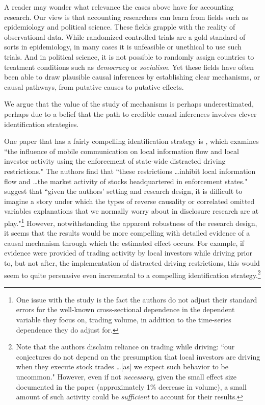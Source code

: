 \documentclass[11pt,reqno,titlepage]{amsart}
\begin{document}
\begin{doublespace}
A reader may wonder what relevance the cases above have for accounting research.
Our view is that accounting researchers can learn from fields such as epidemiology and political science. 
These fields grapple with the reality of observational data.
While randomized controlled trials are a gold standard of sorts in epidemiology, in many cases it is unfeasible or unethical to use such trials.
And in political science, it is not possible to randomly assign countries to treatment conditions such as \emph{democracy} or \emph{socialism}.
Yet these fields have often been able to draw plausible causal inferences by establishing clear mechanisms, or causal pathways, from putative causes to putative effects.

We argue that the value of the study of mechanisms is perhaps underestimated, perhaps due to a belief that the path to credible causal inferences involves clever identification strategies.

One paper that has a fairly compelling identification strategy is \citet{Brown:2015ik}, which examines ``the influence of mobile communication on local information flow and local investor activity using the enforcement of state-wide distracted driving restrictions."
The authors find that ``these restrictions \dots inhibit local information flow and \dots the market activity of stocks headquartered in enforcement states."
\citet[p.\,9]{Miller:2015ec} suggest that ``given the authors' setting and research design, it is difficult to imagine a story under which the types of reverse causality or correlated omitted variables explanations that we normally worry about in disclosure research are at play."\footnote{
One issue with the study is the fact the authors do not adjust their standard errors for the well-known cross-sectional dependence in the dependent variable they focus on, trading volume, in addition to the time-series dependence they do adjust for.}
However, notwithstanding the apparent robustness of the research design, it seems that the results would be more compelling with detailed evidence of a causal mechanism through which the estimated  effect occurs.
For example, if evidence were provided of trading activity by local investors while driving prior to, but not after, the implementation of distracted driving restrictions, this would seem to quite persuasive even incremental to a compelling identification strategy.\footnote{
Note that the authors disclaim reliance on trading while driving: ``our conjectures do not depend on the presumption that local investors are driving when they execute stock trades \dots [as] we expect such behavior to be uncommon."
However, even if not \emph{necessary}, given the small effect size documented in the paper (approximately 1\% decrease in volume), a small amount of such activity could be \emph{sufficient} to account for their results.}


\end{doublespace}
\end{document}
